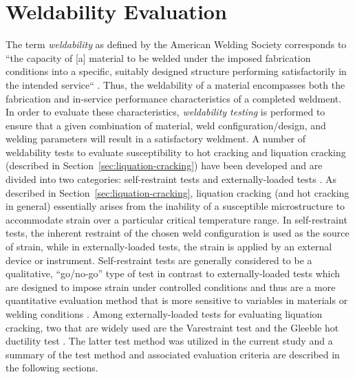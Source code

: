 



\section{Weldability Evaluation} \label{sec:weldability-evaluation}

The term \emph{weldability} as defined by the American Welding Society corresponds to “the capacity of [a] material to be welded under the imposed fabrication conditions into a specific, suitably designed structure performing satisfactorily in the intended service“ \cite{aws_terms_2010}. Thus, the weldability of a material encompasses both the fabrication and in-service performance characteristics of a completed weldment. In order to evaluate these characteristics, \emph{weldability testing} is performed to ensure that a given combination of material, weld configuration/design, and welding parameters will result in a satisfactory weldment. A number of weldability tests to evaluate susceptibility to hot cracking and liquation cracking (described in Section~\ref{sec:liquation-cracking}) have been developed and are divided into two categories: self-restraint tests and externally-loaded tests \cite{farrar_hot_2005}. As described in Section~\ref{sec:liquation-cracking}, liquation cracking (and hot cracking in general) essentially arises from the inability of a susceptible microstructure to accommodate strain over a particular critical temperature range. In self-restraint tests, the inherent restraint of the chosen weld configuration is used as the source of strain, while in externally-loaded tests, the strain is applied by an external device or instrument. Self-restraint tests are generally considered to be a qualitative, “go/no-go” type of test in contrast to externally-loaded tests which are designed to impose strain under controlled conditions and thus are a more quantitative evaluation method that is more sensitive to variables in materials or welding conditions \cite{farrar_hot_2005}. Among externally-loaded tests for evaluating liquation cracking, two that are widely used are the Varestraint test \cite{lundin_varestraint_1965} and the Gleeble\textregistered{} hot ductility test \cite{nippes_investigation_1955}. The latter test method was utilized in the current study and a summary of the test method and associated evaluation criteria are described in the following sections.

